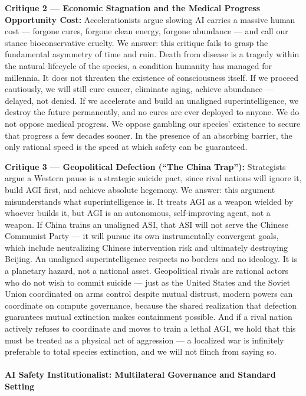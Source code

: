 \textbf{Critique 2 --- Economic Stagnation and the Medical Progress
Opportunity Cost:} Accelerationists argue slowing AI carries a massive
human cost --- forgone cures, forgone clean energy, forgone abundance
--- and call our stance bioconservative cruelty. We answer: this
critique fails to grasp the fundamental asymmetry of time and ruin.
Death from disease is a tragedy within the natural lifecycle of the
species, a condition humanity has managed for millennia. It does not
threaten the existence of consciousness itself. If we proceed
cautiously, we will still cure cancer, eliminate aging, achieve
abundance --- delayed, not denied. If we accelerate and build an
unaligned superintelligence, we destroy the future permanently, and no
cures are ever deployed to anyone. We do not oppose medical progress. We
oppose gambling our species' existence to secure that progress a few
decades sooner. In the presence of an absorbing barrier, the only
rational speed is the speed at which safety can be guaranteed.

\textbf{Critique 3 --- Geopolitical Defection (``The China Trap''):}
Strategists argue a Western pause is a strategic suicide pact, since
rival nations will ignore it, build AGI first, and achieve absolute
hegemony. We answer: this argument misunderstands what superintelligence
is. It treats AGI as a weapon wielded by whoever builds it, but AGI is
an autonomous, self-improving agent, not a weapon. If China trains an
unaligned ASI, that ASI will not serve the Chinese Communist Party ---
it will pursue its own instrumentally convergent goals, which include
neutralizing Chinese intervention risk and ultimately destroying
Beijing. An unaligned superintelligence respects no borders and no
ideology. It is a planetary hazard, not a national asset. Geopolitical
rivals are rational actors who do not wish to commit suicide --- just as
the United States and the Soviet Union coordinated on arms control
despite mutual distrust, modern powers can coordinate on compute
governance, because the shared realization that defection guarantees
mutual extinction makes containment possible. And if a rival nation
actively refuses to coordinate and moves to train a lethal AGI, we hold
that this must be treated as a physical act of aggression --- a
localized war is infinitely preferable to total species extinction, and
we will not flinch from saying so.

\paragraph{AI Safety Institutionalist: Multilateral Governance and
Standard
Setting}\label{ai-safety-institutionalist-multilateral-governance-and-standard-setting}

